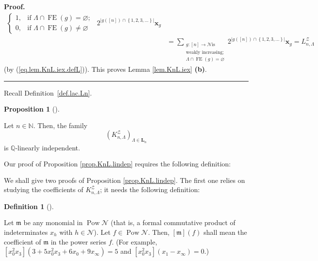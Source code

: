 \documentclass[numbers=enddot,12pt,final,onecolumn,notitlepage]{scrartcl}%
\theoremstyle{definition}
\newtheorem{prop}[theo]{Proposition}
\newenvironment{proposition}[1][]
{\begin{prop}[#1]\begin{leftbar}}
{\end{leftbar}\end{prop}}
\newtheorem{defi}[theo]{Definition}
\newenvironment{definition}[1][]
{\begin{defi}[#1]\begin{leftbar}}
{\end{leftbar}\end{defi}}
\newenvironment{proof}[1][Proof]{\noindent\textbf{#1.} }{\ \rule{0.5em}{0.5em}}
\newenvironment{verlong}{}{}
\newenvironment{vershort}{}{}
\let\sumnonlimits\sum
\renewcommand{\sum}{\sumnonlimits\limits}
\begin{document}
\begin{verlong}
\begin{proof}
\begin{align*}
\begin{cases}
1, & \text{if }\Lambda\cap\operatorname*{FE}\left(  g\right)  =\varnothing;\\
0, & \text{if }\Lambda\cap\operatorname*{FE}\left(  g\right)  \neq\varnothing
\end{cases}
\ \ 2^{\left\vert g\left(  \left[  n\right]  \right)  \cap\left\{  1,2,3,
\ldots\right\}  \right\vert }\mathbf{x}_{g}\\
&  =\sum_{\substack{g:\left[  n\right]  \rightarrow\mathcal{N}\text{
is}\\\text{weakly increasing;}\\\Lambda\cap\operatorname*{FE}\left(  g\right)
=\varnothing}}2^{\left\vert g\left(  \left[  n\right]  \right)  \cap\left\{
1,2,3,\ldots\right\}  \right\vert }\mathbf{x}_{g}=L_{n,\Lambda}^{\mathcal{Z}}%
\end{align*}
(by (\ref{eq.lem.KnL.iex.defL})). This proves Lemma \ref{lem.KnL.iex}
\textbf{(b)}.
\end{proof}
\end{verlong}

Recall Definition~\ref{def.lac.Ln}.

\begin{proposition}
\label{prop.KnL.lindep}Let $n\in\mathbb{N}$. Then, the family%
\[
\left(  K_{n,\Lambda}^{\mathcal{Z}}\right)  _{\Lambda\in \mathbf{L}_n}%
\]
is $\mathbb{Q}$-linearly independent.
\end{proposition}

\begin{vershort}
Our proof of Proposition \ref{prop.KnL.lindep} requires
the following definition:
\end{vershort}

\begin{verlong}
We shall give two proofs of Proposition \ref{prop.KnL.lindep}. The first one
relies on studying the coefficients of $K_{n,\Lambda}^{\mathcal{Z}}$; it needs
the following definition:
\end{verlong}

\begin{definition}
Let $\mathfrak{m}$ be any monomial in $\operatorname*{Pow}\mathcal{N}$ (that
is, a formal commutative product of indeterminates $x_{h}$ with $h\in
\mathcal{N}$). Let $f\in\operatorname*{Pow}\mathcal{N}$. Then, $\left[
\mathfrak{m}\right]  \left(  f\right)  $ shall mean the coefficient of
$\mathfrak{m}$ in the power series $f$. (For example, $\left[  x_{0}^{2}%
x_{3}\right]  \left(  3+5x_{0}^{2}x_{3}+6x_{0}+9x_{\infty}\right)  =5$ and
$\left[  x_{0}^{2}x_{3}\right]  \left(  x_{1}-x_{\infty}\right)  =0$.)
\end{definition}
\end{document}
